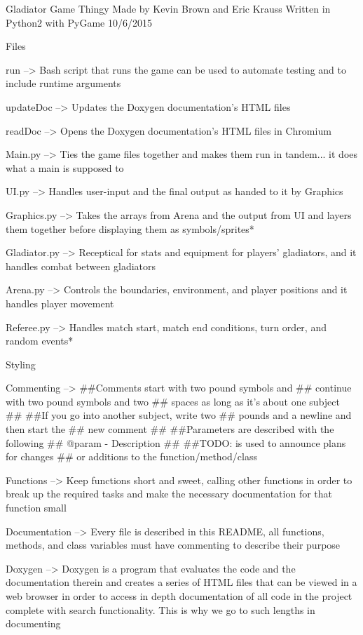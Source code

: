 Gladiator Game Thingy Made by Kevin Brown and Eric Krauss Written in Python2 with Py\+Game 10/6/2015

Files \begin{DoxyVerb}run -->
    Bash script that runs the game
    can be used to automate testing
    and to include runtime arguments

updateDoc -->
    Updates the Doxygen documentation's
    HTML files

readDoc -->
    Opens the Doxygen documentation's
    HTML files in Chromium

Main.py -->
    Ties the game files together and
    makes them run in tandem...
    it does what a main is supposed to

UI.py -->
    Handles user-input and the final
    output as handed to it by Graphics

Graphics.py -->
    Takes the arrays from Arena and the
    output from UI and layers them
    together before displaying them as
    symbols/sprites*

Gladiator.py -->
    Receptical for stats and equipment
    for players' gladiators, and it
    handles combat between gladiators

Arena.py -->
    Controls the boundaries, environment,
    and player positions and it handles
    player movement

Referee.py -->
    Handles match start, match end
    conditions, turn order, and
    random events*
\end{DoxyVerb}


Styling \begin{DoxyVerb}Commenting -->  
    ##Comments start with two pound symbols and
    ##  continue with two pound symbols and two
    ##  spaces as long as it's about one subject
    ##
    ##If you go into another subject, write two 
    ##  pounds and a newline and then start the
    ##  new comment
    ##
    ##Parameters are described with the following
    ##  @param - Description
    ##
    ##TODO:  is used to announce plans for changes
    ##  or additions to the function/method/class

Functions -->
    Keep functions short and sweet, calling other
    functions in order to break up the required
    tasks and make the necessary documentation for
    that function small

Documentation -->
    Every file is described in this README, all
    functions, methods, and class variables must
    have commenting to describe their purpose

Doxygen -->
    Doxygen is a program that evaluates the code
    and the documentation therein and creates a
    series of HTML files that can be viewed in a
    web browser in order to access in depth
    documentation of all code in the project
    complete with search functionality.  This
    is why we go to such lengths in documenting\end{DoxyVerb}
 